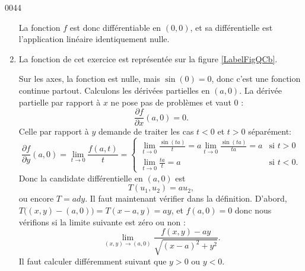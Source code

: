 \begin{corrige}{0044}
\begin{enumerate}
La fonction $f$ est donc différentiable en $(0,0)$, et sa différentielle est l'application linéaire identiquement nulle.

\item 
La fonction de cet exercice est représentée sur la figure \ref{LabelFigQCb}.
\newcommand{\CaptionFigQCb}{La fonction de l'exercice \ref{exo0044}\ref{Item0044b}. En rouge, les zones où la fonction n'est pas trivialement différentiable.}


Sur les axes, la fonction est nulle, mais $\sin(0)=0$, donc c'est une fonction continue partout. Calculons les dérivées partielles en $(a,0)$. La dérivée partielle par rapport à $x$ ne pose pas de problèmes et vaut $0$ :
\begin{equation}
	\frac{ \partial f }{ \partial x }(a,0)=0.
\end{equation}
Celle par rapport à $y$ demande de traiter les cas $t<0$ et $t>0$ séparément:
\begin{equation}
	\frac{ \partial f }{ \partial y }(a,0)=\lim_{t\to 0}\frac{ f(a,t) }{ t }=
\begin{cases}
	\lim_{t\to 0}\frac{ \sin(ta) }{ t }=a\lim_{t\to 0}\frac{ \sin(ta) }{ ta }=a	&	\text{si $t>0$}\\
	\lim_{t\to 0}\frac{ ta }{ t }=a	&	 \text{si $t<0$}.
\end{cases}
\end{equation}
Donc la candidate différentielle en $(a,0)$ est 
\begin{equation}
	T(u_1,u_2)=au_2,
\end{equation}
ou encore $T=ady$. Il faut maintenant vérifier dans la définition. D'abord, $T\big( (x,y)-(a,0) \big)=T(x-a,y)=ay$, et $f(a,0)=0$ donc nous vérifions si la limite suivante est zéro ou non :
\begin{equation}		\label{Eqd0044}
	\lim_{(x,y)\to (a,0)}\frac{ f(x,y)-ay }{ \sqrt{(x-a)^2+y^2} }.
\end{equation}
Il faut calculer différemment suivant que $y>0$ ou $y<0$. 


\end{enumerate}
\end{corrige}
